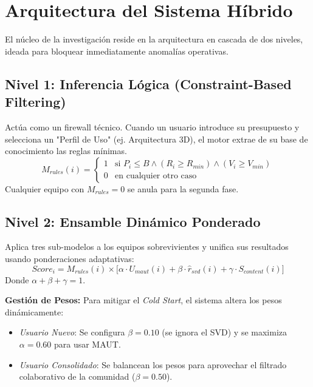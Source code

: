 \documentclass[12pt,a4paper]{report}
\begin{document}
\chapter{Arquitectura del Sistema Híbrido}
El núcleo de la investigación reside en la arquitectura en cascada de dos niveles, ideada para bloquear inmediatamente anomalías operativas.

\section{Nivel 1: Inferencia Lógica (Constraint-Based Filtering)}
Actúa como un firewall técnico. Cuando un usuario introduce su presupuesto y selecciona un "Perfil de Uso" (ej. Arquitectura 3D), el motor extrae de su base de conocimiento las reglas mínimas.
\begin{equation}
    M_{rules}(i) = \begin{cases} 
    1 & \text{si } P_i \le B \land (R_i \ge R_{min}) \land (V_i \ge V_{min}) \\
    0 & \text{en cualquier otro caso}
    \end{cases}
\end{equation}
Cualquier equipo con $M_{rules}=0$ se anula para la segunda fase.

\section{Nivel 2: Ensamble Dinámico Ponderado}
Aplica tres sub-modelos a los equipos sobrevivientes y unifica sus resultados usando ponderaciones adaptativas:
\begin{equation}
    Score_i = M_{rules}(i) \times \Big[ \alpha \cdot U_{maut}(i) + \beta \cdot \hat{r}_{svd}(i) + \gamma \cdot S_{content}(i) \Big]
\end{equation}
Donde $\alpha + \beta + \gamma = 1$. 

\textbf{Gestión de Pesos:}
Para mitigar el \textit{Cold Start}, el sistema altera los pesos dinámicamente:
\begin{itemize}
    \item \textit{Usuario Nuevo}: Se configura $\beta = 0.10$ (se ignora el SVD) y se maximiza $\alpha = 0.60$ para usar MAUT.
    \item \textit{Usuario Consolidado}: Se balancean los pesos para aprovechar el filtrado colaborativo de la comunidad ($\beta = 0.50$).
\end{itemize}

\end{document}
